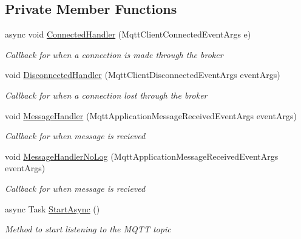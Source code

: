 \subsection*{Private Member Functions}
\begin{DoxyCompactItemize}
\item 
\mbox{\label{class_pozyx_positioner_1_1_framework_1_1_mqtt_client_a5e0d99ca6d75c3ee47dc455eb6ff438c}} 
async void \hyperlink{class_pozyx_positioner_1_1_framework_1_1_mqtt_client_a5e0d99ca6d75c3ee47dc455eb6ff438c}{Connected\+Handler} (Mqtt\+Client\+Connected\+Event\+Args e)
\begin{DoxyCompactList}\small\item\em Callback for when a connection is made through the broker \end{DoxyCompactList}\item 
void \hyperlink{class_pozyx_positioner_1_1_framework_1_1_mqtt_client_adcfdb0246431f7e43d2810b8bf3e0873}{Disconnected\+Handler} (Mqtt\+Client\+Disconnected\+Event\+Args event\+Args)
\begin{DoxyCompactList}\small\item\em Callback for when a connection lost through the broker \end{DoxyCompactList}\item 
void \hyperlink{class_pozyx_positioner_1_1_framework_1_1_mqtt_client_a1fda7c69a63eeeb876490644686b103f}{Message\+Handler} (Mqtt\+Application\+Message\+Received\+Event\+Args event\+Args)
\begin{DoxyCompactList}\small\item\em Callback for when message is recieved \end{DoxyCompactList}\item 
void \hyperlink{class_pozyx_positioner_1_1_framework_1_1_mqtt_client_ab9a1361b72712044aa1d770006ebd6cd}{Message\+Handler\+No\+Log} (Mqtt\+Application\+Message\+Received\+Event\+Args event\+Args)
\begin{DoxyCompactList}\small\item\em Callback for when message is recieved \end{DoxyCompactList}\item 
async Task \hyperlink{class_pozyx_positioner_1_1_framework_1_1_mqtt_client_a92ccb3ea4e84923cfb26c02367fac49e}{Start\+Async} ()
\begin{DoxyCompactList}\small\item\em Method to start listening to the M\+Q\+TT topic \end{DoxyCompactList}\end{DoxyCompactItemize}
